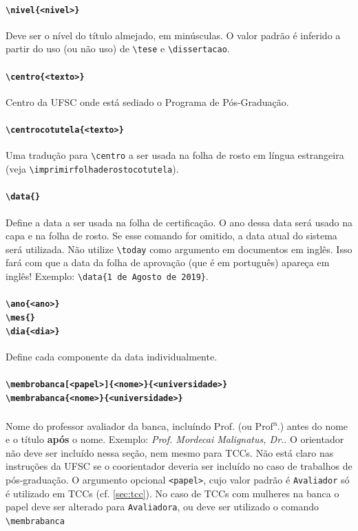 \documentclass[embeddedlogo]{ufsc-thesis-rn46-2019}
\newcommand{\lacmd}[1]{\texttt{\textbackslash{}#1}}
\begin{document}
\paragraph*{\lacmd{nivel\{<nivel>\}}} Deve ser o nível do título almejado, em
minúsculas. O valor padrão é inferido a partir do uso (ou não uso) de
\lacmd{tese} e \lacmd{dissertacao}.

\paragraph*{\lacmd{centro\{<texto>\}}} Centro da UFSC onde está sediado o
Programa de Pós-Graduação.

\paragraph*{\lacmd{centrocotutela\{<texto>\}}} Uma tradução para
\lacmd{centro} a ser usada na folha de rosto em língua estrangeira (veja
\lacmd{imprimirfolhaderostocotutela}).

\paragraph*{\lacmd{data\{<data por extenso>\}}} Define a data a ser usada na
folha de certificação. O ano dessa data será usado na capa e na folha de
rosto. Se esse comando for omitido, a data atual do sistema será utilizada. Não
utilize \lacmd{today} como argumento em documentos em inglês. Isso fará com que
a data da folha de aprovação (que é em português) apareça em inglês! Exemplo:
\lacmd{data\{1 de Agosto de 2019\}}.

\paragraph*{\lacmd{ano\{<ano>\}} \\
            \lacmd{mes\{<nome do mes>\}} \\
            \lacmd{dia\{<dia>\}}}
Define cada componente da data individualmente.

\paragraph*{\lacmd{membrobanca[<papel>]\{<nome>\}\{<universidade>\}} \\
            \lacmd{membrabanca\{<nome>\}\{<universidade>\}}}
Nome do professor avaliador da banca, incluíndo Prof. (ou
Prof\textsuperscript{a}.) antes do nome e o título \textbf{após} o
nome. Exemplo: \emph{Prof. Mordecai Malignatus, Dr.}. O orientador não deve ser
incluído nessa seção, nem mesmo para TCCs. Não está claro nas instruções da UFSC
se o coorientador deveria ser incluído no caso de trabalhos de pós-graduação. O
argumento opcional \texttt{<papel>}, cujo valor padrão é \texttt{Avaliador} só é
utilizado em TCCs (cf. \autoref{sec:tcc}). No caso de TCCs com mulheres na banca
o papel deve ser alterado para \texttt{Avaliadora}, ou deve ser utilizado o
comando \lacmd{membrabanca}
\end{document}
